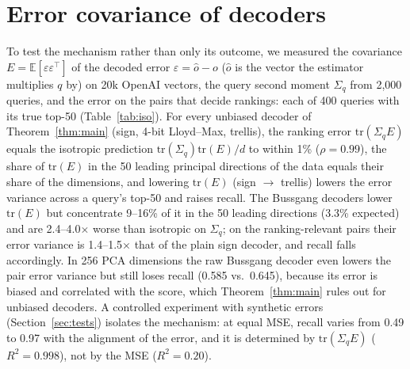 \documentclass[10pt]{article}
\begin{document}
\section{Error covariance of decoders}\label{sn:iso}
To test the mechanism rather than only its outcome, we measured the covariance $E=\mathbb{E}[\varepsilon\varepsilon^\top]$ of the decoded error $\varepsilon=\hat o-o$ ($\hat o$ is the vector the estimator multiplies $q$ by) on 20k OpenAI vectors, the query second moment $\Sigma_q$ from 2{,}000 queries, and the error on the pairs that decide rankings: each of 400 queries with its true top-50 (Table~\ref{tab:iso}). For every unbiased decoder of Theorem~\ref{thm:main} (sign, 4-bit Lloyd--Max, trellis), the ranking error $\mathrm{tr}(\Sigma_qE)$ equals the isotropic prediction $\mathrm{tr}(\Sigma_q)\mathrm{tr}(E)/d$ to within 1\% ($\rho=0.99$), the share of $\mathrm{tr}(E)$ in the 50 leading principal directions of the data equals their share of the dimensions, and lowering $\mathrm{tr}(E)$ (sign $\to$ trellis) lowers the error variance across a query's top-50 and raises recall. The Bussgang decoders lower $\mathrm{tr}(E)$ but concentrate 9--16\% of it in the 50 leading directions (3.3\% expected) and are 2.4--4.0$\times$ worse than isotropic on $\Sigma_q$; on the ranking-relevant pairs their error variance is 1.4--1.5$\times$ that of the plain sign decoder, and recall falls accordingly. In 256 PCA dimensions the raw Bussgang decoder even lowers the pair error variance but still loses recall (0.585 vs.\ 0.645), because its error is biased and correlated with the score, which Theorem~\ref{thm:main} rules out for unbiased decoders. A controlled experiment with synthetic errors (Section~\ref{sec:tests}) isolates the mechanism: at equal MSE, recall varies from 0.49 to 0.97 with the alignment of the error, and it is determined by $\mathrm{tr}(\Sigma_qE)$ ($R^2=0.998$), not by the MSE ($R^2=0.20$).
\end{document}
